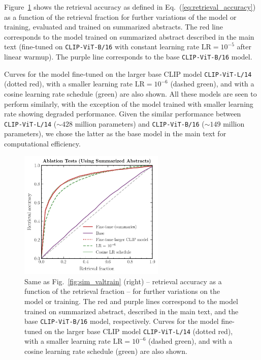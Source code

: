 \documentclass[10pt]{article} %
\newcommand{\eqrefb}[1]{(\ref{#1})}
\begin{document}
Figure~\ref{fig:sim_app} shows the retrieval accuracy as defined in Eq.~\eqrefb{eq:retrieval_accuracy} as a function of the retrieval fraction for further variations of the model or training, evaluated and trained on summarized abstracts. The red line corresponds to the model trained on summarized abstract described in the main text (fine-tuned on \texttt{CLIP-ViT-B/16} with constant learning rate $\mathrm{LR}=10^{-5}$ after linear warmup). The purple line corresponds to the base \texttt{CLIP-ViT-B/16} model.

Curves for the model fine-tuned on the larger base CLIP model \texttt{CLIP-ViT-L/14} (dotted red), with a smaller learning rate $\mathrm{LR}=10^{-6}$ (dashed green), and with a cosine learning rate schedule (green) are also shown. All these models are seen to perform similarly, with the exception of the model trained with smaller learning rate showing degraded performance. Given the similar performance between \texttt{CLIP-ViT-L/14} ($\sim 428$ million parameters) and \texttt{CLIP-ViT-B/16} ($\sim 149$ million parameters), we chose the latter as the base model in the main text for computational efficiency.


\begin{figure}[!h]
  \centering
  \includegraphics[width=0.62\textwidth]{plots/retrieval_app.pdf}
  \caption{Same as Fig.~\ref{fig:sim_valtrain} (right) -- retrieval accuracy as a function of the retrieval fraction -- for further variations on the model or training. The red and purple lines correspond to the model trained on summarized abstract, described in the main text, and the base \texttt{CLIP-ViT-B/16} model, respectively. Curves for the model fine-tuned on the larger base CLIP model \texttt{CLIP-ViT-L/14} (dotted red), with a smaller learning rate $\mathrm{LR}=10^{-6}$ (dashed green), and with a cosine learning rate schedule (green) are also shown.}
  \label{fig:sim_app}
  \end{figure}
  
\end{document}
